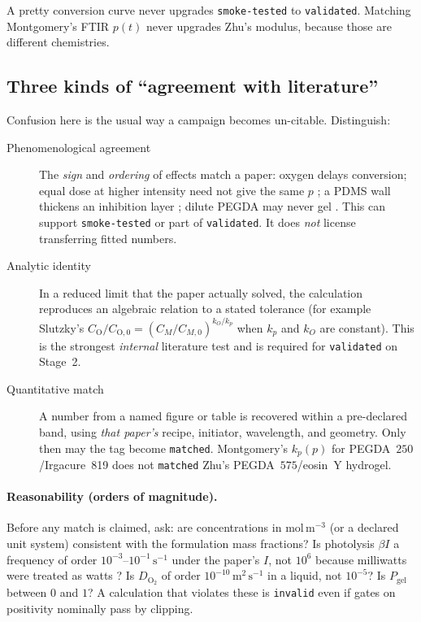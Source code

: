 \documentclass[11pt,a4paper]{article}
\newcommand{\tagsmoke}{\texttt{smoke-tested}}
\newcommand{\tagvalid}{\texttt{validated}}
\newcommand{\tagmatch}{\texttt{matched}}
\newcommand{\taginvalid}{\texttt{invalid}}
\begin{document}
A pretty conversion curve never upgrades \tagsmoke{} to \tagvalid.
Matching Montgomery's FTIR $p(t)$ never upgrades Zhu's modulus, because those are different chemistries.

\subsection{Three kinds of ``agreement with literature''}

Confusion here is the usual way a campaign becomes un-citable.
Distinguish:

\begin{description}
  \item[Phenomenological agreement]
    The \emph{sign} and \emph{ordering} of effects match a paper: oxygen delays conversion; equal dose at higher intensity need not give the same $p$ \citep{Wydra2014,Lin2019}; a PDMS wall thickens an inhibition layer \citep{Dendukuri2008}; dilute PEGDA may never gel \citep{Zhu2020}.
    This can support \tagsmoke{} or part of \tagvalid.
    It does \emph{not} license transferring fitted numbers.
  \item[Analytic identity]
    In a reduced limit that the paper actually solved, the calculation reproduces an algebraic relation to a stated tolerance (for example Slutzky's $C_{\mathrm{O}}/C_{\mathrm{O},0}=(C_M/C_{M,0})^{k_O/k_p}$ when $k_p$ and $k_O$ are constant).
    This is the strongest \emph{internal} literature test and is required for \tagvalid{} on Stage~2.
  \item[Quantitative match]
    A number from a named figure or table is recovered within a pre-declared band, using \emph{that paper's} recipe, initiator, wavelength, and geometry.
    Only then may the tag become \tagmatch.
    Montgomery's $k_p(p)$ for PEGDA~$250$/Irgacure~819 does not \tagmatch{} Zhu's PEGDA~$575$/eosin~Y hydrogel.
\end{description}

\paragraph{Reasonability (orders of magnitude).}
Before any match is claimed, ask: are concentrations in $\mathrm{mol\,m^{-3}}$ (or a declared unit system) consistent with the formulation mass fractions?
Is photolysis $\beta I$ a frequency of order $10^{-3}$--$10^{-1}\,\mathrm{s^{-1}}$ under the paper's $I$, not $10^{6}$ because milliwatts were treated as watts \citep{Montgomery2022}?
Is $D_{\mathrm{O}_2}$ of order $10^{-10}\,\mathrm{m^2\,s^{-1}}$ in a liquid, not $10^{-5}$?
Is $P_{\mathrm{gel}}$ between $0$ and $1$?
A calculation that violates these is \taginvalid{} even if gates on positivity nominally pass by clipping.
\end{document}
